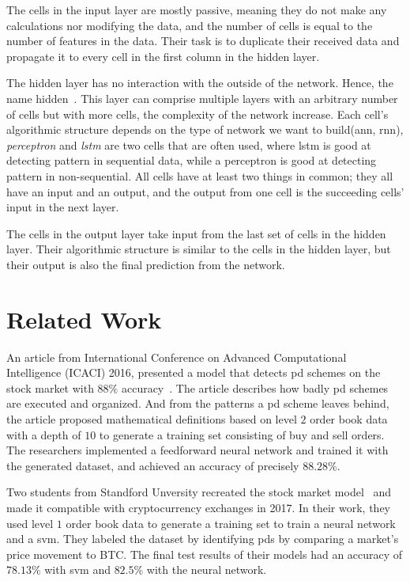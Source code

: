 The cells in the input layer are mostly passive, meaning they do not make any calculations nor modifying the data, and the number of cells is equal to the number of features in the data. Their task is to duplicate their received data and propagate it to every cell in the first column in the hidden layer.

The hidden layer has no interaction with the outside of the network. Hence, the name hidden~\cite{data_science, stanford}. This layer can comprise multiple layers with an arbitrary number of cells but with more cells, the complexity of the network increase. Each cell's algorithmic structure depends on the type of network we want to build(\ac{ann}, \ac{rnn}), \emph{perceptron} and \emph{lstm} are two cells that are often used, where \ac{lstm} is good at detecting pattern in sequential data, while a perceptron is good at detecting pattern in non-sequential. All cells have at least two things in common; they all have an input and an output, and the output from one cell is the succeeding cells' input in the next layer. 

The cells in the output layer take input from the last set of cells in the hidden layer. Their algorithmic structure is similar to the cells in the hidden layer, but their output is also the final prediction from the network.

\section{Related Work}\label{sec:related_work}
An article from International Conference on Advanced Computational Intelligence (ICACI) 2016, presented a model that detects \ac{pd} schemes on the stock market with $88\%$ accuracy~\cite{P&D_stock_price_manipulation}. The article describes how badly \ac{pd} schemes are executed and organized. And from the patterns a \ac{pd} scheme leaves behind, the article proposed mathematical definitions based on level $2$ order book data with a depth of $10$ to generate a training set consisting of buy and sell orders. The researchers implemented a feedforward neural network and trained it with the generated dataset, and achieved an accuracy of precisely $88.28\%$.

Two students from Standford Unversity recreated the stock market model~\cite{P&D_stock_price_manipulation} and made it compatible with cryptocurrency exchanges in 2017. In their work, they used level $1$ order book data to generate a training set to train a neural network and a \ac{svm}. They labeled the dataset by identifying \acp{pd} by comparing a market's price movement to BTC. The final test results of their models had an accuracy of $78.13\%$ with \ac{svm} and $82.5$\% with the neural network. 

